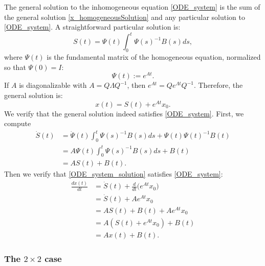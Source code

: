 \documentclass[../../lecture_notes.tex]{subfiles}
\begin{document}
The general solution to the inhomogeneous equation \eqref{ODE_system} is the sum of the general solution \eqref{x_homogeneousSolution} and any particular solution to \eqref{ODE_system}.
A straightforward particular solution is:
\begin{equation*}
  S(t)=\Psi(t)\int_{0}^{t}\Psi(s)^{-1}B(s)ds,
\end{equation*}
where \(\Psi(t)\) is the fundamental matrix of the homogeneous equation, normalized so that \(\Psi(0)=I\):
\begin{equation*}
  \Psi(t):= e^{At}.
\end{equation*}
If \(A\) is diagonalizable with \(A=Q\Lambda Q^{-1}\), then \(e^{At}=Qe^{\Lambda t}Q^{-1}\).
Therefore, the general solution is:
\begin{equation}
  x(t)=S(t)+e^{At}x_{0}.
  \label{ODE_system_solution}
\end{equation}
We verify that the general solution indeed satisfies \eqref{ODE_system}.
First, we compute
\begin{align*}
  \dot{S}(t) &=\dot{\Psi}(t)\int_{0}^{t}\Psi(s)^{-1}B(s)ds+\Psi(t)\Psi(t)^{-1}B(t) \\
  &=A\Psi(t)\int_{0}^{t}\Psi(s)^{-1}B(s)ds+B(t) \\
  &=AS(t)+B(t).
\end{align*}
Then we verify that \eqref{ODE_system_solution} satisfies \eqref{ODE_system}:
\begin{align*}
  \frac{dx(t)}{dt} &=\dot{S}(t)+\frac{d}{dt}\big(e^{At}x_{0}\big) \\
  &=\dot{S}(t)+Ae^{At}x_{0} \\
  &=AS(t)+B(t)+Ae^{At}x_{0} \\
  &=A\left( S(t)+e^{At}x_{0}\right) +B(t) \\
  &=Ax(t)+B(t).
\end{align*}

\subsubsection{The \(2\times 2\) case}
\end{document}
